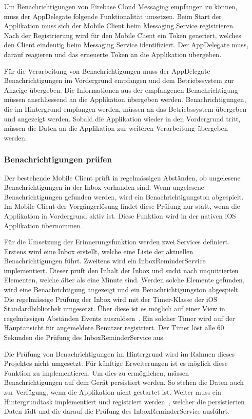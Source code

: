 Um Benachrichtigungen von Firebase Cloud Messaging empfangen zu können, muss der AppDelegate folgende Funktionalität umsetzen.
Beim Start der Applikation muss sich der Mobile Client beim Messaging Service registrieren.
Nach der Registrierung wird für den Mobile Client ein Token generiert, welches den Client eindeutig beim Messaging Service identifiziert.
Der AppDelegate muss, darauf reagieren und das erneuerte Token an die Applikation übergeben.

Für die Verarbeitung von Benachrichtigungen muss der AppDelegate Benachrichtigungen im Vordergrund empfangen und dem Betriebssystem zur Anzeige übergeben.
Die Informationen aus der empfangenen Benachrichtigung müssen anschliessend an die Applikation übergeben werden.
Benachrichtigungen, die im Hintergrund empfangen werden, müssen an das Betriebssystem übergeben und angezeigt werden.
Sobald die Applikation wieder in den Vordergrund tritt, müssen die Daten an die Applikation zur weiteren Verarbeitung übergeben werden.

\subsubsection{Benachrichtigungen prüfen}

Der bestehende Mobile Client prüft in regelmässigen Abständen, ob ungelesene Benachrichtigungen in der Inbox vorhanden sind.
Wenn ungelesene Benachrichtigungen gefunden werden, wird ein Benachrichtigungston abgespielt.
Im Mobile Client der Vorgängerlösung findet diese Prüfung nur statt, wenn die Applikation in Vordergrund aktiv ist.
Diese Funktion wird in der nativen iOS Applikation übernommen.

Für die Umsetzung der Erinnerungsfunktion werden zwei Services definiert.
Erstens wird eine Inbox erstellt, welche eine Liste der aktuellen Benachrichtigungen führt.
Zweitens wird ein InboxReminderService implementiert.
Dieser prüft den Inhalt der Inbox und sucht nach unquittierten Elementen, welche älter als eine Minute sind.
Werden solche Elemente gefunden, wird eine Benachrichtigung angezeigt und ein Benachrichtigungston abgespielt.
Die regelmässige Prüfung der Inbox wird mit der Timer-Klasse der iOS Standardbibliothek umgesetzt.
Über diese ist es möglich auf einer View in regelmässigen Abständen Events auszulösen~\cite{ios_timer}.
Ein solcher Timer wird auf der Hauptansicht für angemeldete Benutzer registriert.
Der Timer löst alle 60 Sekunden die Prüfung des InboxReminderService aus.

Die Prüfung von Benachrichtigungen im Hintergrund wird im Rahmen dieses Projektes nicht umgesetzt.
Für künftige Erweiterungen ist es möglich diese Funktion zu implementieren.
Um dies zu ermöglichen, müssen Benachrichtigungen auf dem Gerät persistiert werden.
So stehen die Daten auch zur Verfügung, wenn die Applikation nicht gestartet ist.
Weiter muss ein Hintergrundtask implementiert und registriert werden~\cite{ios_bgtaskscheduler}, welcher die persistierten Daten lädt und die darauf die Prüfung des InboxReminderService ausführt.

